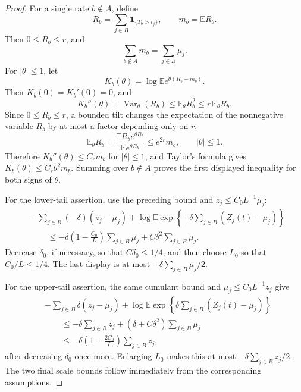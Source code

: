 \documentclass[11pt]{article}
\theoremstyle{remark}
\newcommand{\Ee}{\mathbb E}
\newcommand{\one}{\mathbf 1}
\newcommand{\Var}{\operatorname{Var}}
\begin{document}
\begin{proof}
For a single rate \(b\notin A\), define
\[
        R_b=\sum_{j\in B}\one_{\{T_b>t_j\}},
        \qquad m_b=\Ee R_b .
\]
Then \(0\le R_b\le r\), and
\[
        \sum_{b\notin A}m_b=\sum_{j\in B}\mu_j .
\]
For \(|\theta|\le1\), let
\[
        K_b(\theta)=\log \Ee e^{\theta(R_b-m_b)} .
\]
Then \(K_b(0)=K_b'(0)=0\), and
\[
        K_b''(\theta)=\Var_\theta(R_b)
        \le \Ee_\theta R_b^2
        \le r\,\Ee_\theta R_b .
\]
Since \(0\le R_b\le r\), a bounded tilt changes the expectation of the
nonnegative variable \(R_b\) by at most a factor depending only on \(r\):
\[
        \Ee_\theta R_b
        =\frac{\Ee R_be^{\theta R_b}}{\Ee e^{\theta R_b}}
        \le e^{2r}m_b,
        \qquad |\theta|\le1 .
\]
Therefore \(K_b''(\theta)\le C_rm_b\) for \(|\theta|\le1\), and Taylor's
formula gives \(K_b(\theta)\le C_r\theta^2m_b\).  Summing over
\(b\notin A\) proves the first displayed inequality for both signs of
\(\theta\).

For the lower-tail assertion, use the preceding bound and
\(z_j\le C_0L^{-1}\mu_j\):
\[
\begin{aligned}
&-\sum_{j\in B}(-\delta)(z_j-\mu_j)
 +\log \Ee\exp\left\{-\delta\sum_{j\in B}(Z_j(t)-\mu_j)\right\} \\
&\qquad\le
        -\delta\left(1-\frac{C_0}{L}\right)\sum_{j\in B}\mu_j
        +C\delta^2\sum_{j\in B}\mu_j .
\end{aligned}
\]
Decrease \(\delta_0\), if necessary, so that \(C\delta_0\le1/4\), and then
choose \(L_0\) so that \(C_0/L\le1/4\).  The last display is at most
\(-\delta\sum_{j\in B}\mu_j/2\).

For the upper-tail assertion, the same cumulant bound and
\(\mu_j\le C_0L^{-1}z_j\) give
\[
\begin{aligned}
&-\sum_{j\in B}\delta(z_j-\mu_j)
 +\log \Ee\exp\left\{\delta\sum_{j\in B}(Z_j(t)-\mu_j)\right\} \\
&\qquad\le
        -\delta\sum_{j\in B}z_j
        +(\delta+C\delta^2)\sum_{j\in B}\mu_j\\
&\qquad\le
        -\delta\left(1-\frac{2C_0}{L}\right)
        \sum_{j\in B}z_j,
\end{aligned}
\]
after decreasing \(\delta_0\) once more.  Enlarging \(L_0\) makes this at
most \(-\delta\sum_{j\in B}z_j/2\).  The two final scale bounds follow
immediately from the corresponding assumptions.
\end{proof}
\end{document}
